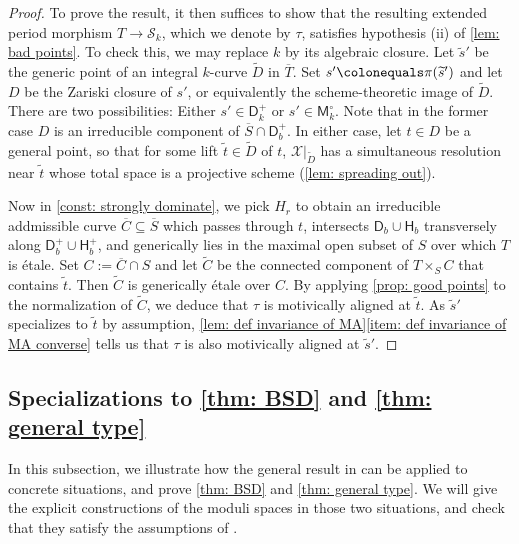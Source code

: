 \documentclass[11pt, letterpaper]{amsart}
\theoremstyle{plain}
\theoremstyle{definition}
\newcommand{\<}{\langle}
\renewcommand{\>}{\rangle}
\def\wt{\widetilde}
\newcommand{\shS}{\mathscr{S}}
\newcommand{\sfD}{\mathsf{D}}
\newcommand{\sfM}{\mathsf{M}}
\newcommand{\sX}{\mathcal{X}}
\newcommand{\sfH}{\mathsf{H}}
\begin{document}
\begin{proof}
    To prove the result, it then suffices to show that the resulting extended period morphism $T \to \shS_k$, which we denote by $\tau$, satisfies hypothesis (ii) of \cref{lem: bad points}.
    To check this, we may replace $k$ by its algebraic closure. 
    Let $\wt{s}'$ be the generic point of an integral $k$-curve $\wt{D}$ in $\overline{T}$. 
    Set $s' \colonequals \pi(\wt{s}')$ and let $D$ be the Zariski closure of $s'$, or equivalently the scheme-theoretic image of $\wt{D}$. 
    There are two possibilities: Either $s' \in \sfD^+_k$ or $s' \in \sfM^\circ_k$. 
    Note that in the former case $D$ is an irreducible component of $\overline{S} \cap \sfD^+_b$. 
    In either case, let $t \in D$ be a general point, so that for some lift $\wt{t} \in \wt{D}$ of $t$, $\sX|_{\wt{D}}$ has a simultaneous resolution near $\wt{t}$ whose total space is a projective scheme (\cref{lem: spreading out}). 

    
    Now in \cref{const: strongly dominate}, we pick $H_{r}$ to obtain an irreducible addmissible curve $\overline{C} \subseteq \overline{S}$ which passes through $t$, intersects $\sfD_b \cup \sfH_b$ transversely along $\sfD^+_b \cup \sfH^+_b$, and generically lies in the maximal open subset of $S$ over which $T$ is \'etale. 
    Set $C := \overline{C} \cap S$ and let $\wt{C}$ be the connected component of $T \times_S C$ that contains $\wt{t}$. 
    Then $\wt{C}$ is generically \'etale over $C$. 
    By applying \cref{prop: good points} to the normalization of $\wt{C}$, we deduce that $\tau$ is motivically aligned at $\wt{t}$. 
    As $\wt{s}'$ specializes to $\wt{t}$ by assumption, 
    \cref{lem: def invariance of MA}\ref{item: def invariance of MA converse} tells us that $\tau$ is also motivically aligned at $\wt{s}'$. 
\end{proof}


\subsection{Specializations to \cref{thm: BSD} and \cref{thm: general type}}
\label{sec: thms 1.1 and 1.2}
In this subsection, we illustrate how the general result in  can be applied to concrete situations, and prove \cref{thm: BSD} and \cref{thm: general type}.
We will give the explicit constructions of the moduli spaces in those two situations, and check that they satisfy the assumptions of .
\end{document}
